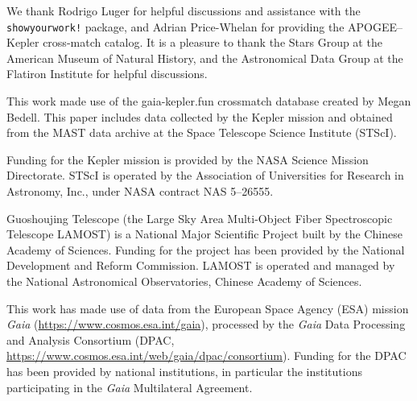\documentclass[linenumbers,tighten,trackchanges,twocolumn]{aastex631}
\begin{document}
\begin{acknowledgments}
We thank Rodrigo Luger for helpful discussions and assistance with the \texttt{showyourwork!} package, and Adrian Price-Whelan for providing the APOGEE--Kepler cross-match catalog. It is a pleasure to thank the Stars Group at the American Museum of Natural History, and the Astronomical Data Group at the Flatiron Institute for helpful discussions. 

This work made use of the gaia-kepler.fun crossmatch database created by Megan Bedell. This paper includes data collected by the Kepler mission and obtained from the MAST data archive at the Space Telescope Science Institute (STScI). 

Funding for the Kepler mission is provided by the NASA Science Mission Directorate. STScI is operated by the Association of Universities for Research in Astronomy, Inc., under NASA contract NAS 5–26555. 

Guoshoujing Telescope (the Large Sky Area Multi-Object Fiber Spectroscopic Telescope LAMOST) is a National Major Scientific Project built by the Chinese Academy of Sciences. Funding for the project has been provided by the National Development and Reform Commission. LAMOST is operated and managed by the National Astronomical Observatories, Chinese Academy of Sciences. 

This work has made use of data from the European Space Agency (ESA) mission {\it Gaia} (\url{https://www.cosmos.esa.int/gaia}), processed by the {\it Gaia} Data Processing and Analysis Consortium (DPAC, \url{https://www.cosmos.esa.int/web/gaia/dpac/consortium}). Funding for the DPAC has been provided by national institutions, in particular the institutions participating in the {\it Gaia} Multilateral Agreement. 


\end{acknowledgments}
\end{document}
